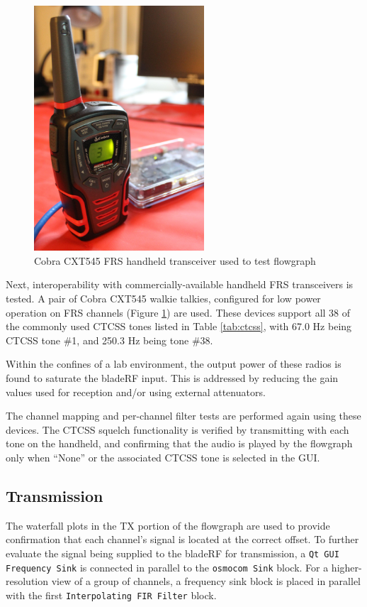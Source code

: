 \begin{figure}[h]
  \centering
  \includegraphics[width=2.5in]{images/frs/handheld.jpg}
  \caption{Cobra CXT545 FRS handheld transceiver used to test flowgraph}
  \label{fig:handheld}
\end{figure}

Next, interoperability with commercially-available handheld \ac{FRS}
transceivers is tested. A pair of Cobra CXT545 \cite{COBRA_CXT545} walkie
talkies, configured for low power operation on FRS channels (Figure
\ref{fig:handheld}) are used.  These devices support all 38 of the commonly used
\ac{CTCSS} tones listed in Table \ref{tab:ctcss}, with 67.0 Hz being \ac{CTCSS}
tone \#1, and 250.3 Hz being tone \#38.

Within the confines of a lab environment, the output power of these radios
is found to saturate the bladeRF input. This is addressed by reducing the
gain values used for reception and/or using external attenuators.

The channel mapping and per-channel filter tests are performed again using
these devices. The \ac{CTCSS} squelch functionality is verified by transmitting
with each tone on the handheld, and confirming that the audio is played by the
flowgraph only when ``None'' or the associated \ac{CTCSS} tone is selected in
the \ac{GUI}.

\subsection{Transmission}

The waterfall plots in the \ac{TX} portion of the flowgraph are used to provide
confirmation that each channel's signal is located at the correct offset.
To further evaluate the signal being supplied to the bladeRF for transmission, a
\texttt{Qt GUI Frequency Sink} is connected in parallel to the
\texttt{osmocom Sink} block. For a higher-resolution view of a group of channels,
a frequency sink block is placed in parallel with the first
\texttt{Interpolating FIR Filter} block.

